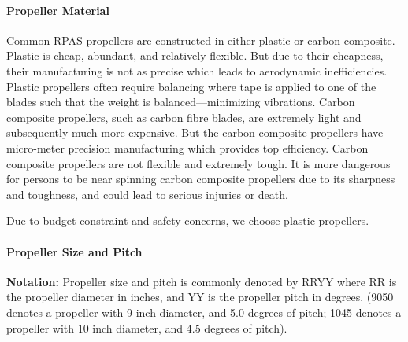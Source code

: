 \paragraph{Propeller Material}

Common RPAS propellers are constructed in either plastic or carbon composite. Plastic is cheap, abundant, 
and relatively flexible. But due to their cheapness, their manufacturing is not as precise which leads to 
aerodynamic inefficiencies. Plastic propellers often require balancing where tape is applied to one of the 
blades such that the weight is balanced---minimizing vibrations. Carbon composite propellers, such as 
carbon fibre blades, are extremely light and subsequently much more expensive. But the carbon composite 
propellers have micro-meter precision manufacturing which provides top efficiency. Carbon composite 
propellers are not flexible and extremely tough. It is more dangerous for persons to be near spinning 
carbon composite propellers due to its sharpness and toughness, and could lead to serious injuries or death.

Due to budget constraint and safety concerns, we choose plastic propellers.

\paragraph{Propeller Size and Pitch}

\textbf{Notation: } Propeller size and pitch is commonly denoted by RRYY where RR is the propeller diameter in inches, and YY is the propeller pitch in degrees. (9050 denotes a propeller with 9 inch diameter, and 5.0 degrees of pitch; 1045 denotes a propeller with 10 inch diameter, and 4.5 degrees of pitch).

